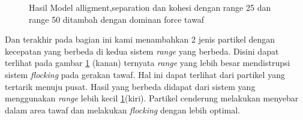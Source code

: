\begin{figure}
\hfill
{}

\caption{Hasil Model alligment,separation dan kohesi dengan range 25 dan range 50 ditambah dengan dominan force tawaf}
\label{fig:2grafikmodel4gaya}
\end{figure}

Dan terakhir pada bagian ini kami menambahkan 2 jenis partikel dengan kecepatan yang berbeda di kedua sistem \textit{range} yang berbeda. Disini dapat terlihat pada gambar \ref{fig:2grafikmodel4gaya} (kanan) ternyata \textit{range} yang lebih besar mendistrupsi sistem \textit{flocking} pada gerakan tawaf. Hal ini dapat terlihat dari partikel yang tertarik menuju pusat. Hasil yang berbeda didapat dari sistem yang menggunakan \textit{range} lebih kecil \ref{fig:2grafikmodel4gaya}(kiri). Partikel cenderung melakukan menyebar dalam area tawaf dan melakukan \textit{flocking} dengan lebih optimal. 

